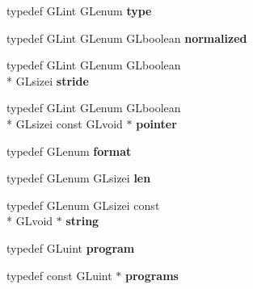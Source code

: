 \begin{DoxyCompactItemize}
\item 
\hypertarget{class_c_p_v_r_tgles_ext_a5308e926ccad106956900ab5d4c05d42}{typedef G\+Lint G\+Lenum {\bfseries type}}\label{class_c_p_v_r_tgles_ext_a5308e926ccad106956900ab5d4c05d42}

\item 
\hypertarget{class_c_p_v_r_tgles_ext_aed0f3a271ef843d49740bcd8c2b6e8bb}{typedef G\+Lint G\+Lenum G\+Lboolean {\bfseries normalized}}\label{class_c_p_v_r_tgles_ext_aed0f3a271ef843d49740bcd8c2b6e8bb}

\item 
\hypertarget{class_c_p_v_r_tgles_ext_af1d0894683af5fa10e460a1ba28d6939}{typedef G\+Lint G\+Lenum G\+Lboolean \\*
G\+Lsizei {\bfseries stride}}\label{class_c_p_v_r_tgles_ext_af1d0894683af5fa10e460a1ba28d6939}

\item 
\hypertarget{class_c_p_v_r_tgles_ext_ae19fe1cea28a7fb2874dda0bd8499c51}{typedef G\+Lint G\+Lenum G\+Lboolean \\*
G\+Lsizei const G\+Lvoid $\ast$ {\bfseries pointer}}\label{class_c_p_v_r_tgles_ext_ae19fe1cea28a7fb2874dda0bd8499c51}

\item 
\hypertarget{class_c_p_v_r_tgles_ext_a91c81435759c3d9e39ad635fb45f32f0}{typedef G\+Lenum {\bfseries format}}\label{class_c_p_v_r_tgles_ext_a91c81435759c3d9e39ad635fb45f32f0}

\item 
\hypertarget{class_c_p_v_r_tgles_ext_a5270e4af3284ff77df101d862974bdb9}{typedef G\+Lenum G\+Lsizei {\bfseries len}}\label{class_c_p_v_r_tgles_ext_a5270e4af3284ff77df101d862974bdb9}

\item 
\hypertarget{class_c_p_v_r_tgles_ext_ab3e1ee5831f5e8bdc658635adb1872b1}{typedef G\+Lenum G\+Lsizei const \\*
G\+Lvoid $\ast$ {\bfseries string}}\label{class_c_p_v_r_tgles_ext_ab3e1ee5831f5e8bdc658635adb1872b1}

\item 
\hypertarget{class_c_p_v_r_tgles_ext_aaa955396ce1535b0bad8e864cb6f70a0}{typedef G\+Luint {\bfseries program}}\label{class_c_p_v_r_tgles_ext_aaa955396ce1535b0bad8e864cb6f70a0}

\item 
\hypertarget{class_c_p_v_r_tgles_ext_a0424201e2433098d279605a476247291}{typedef const G\+Luint $\ast$ {\bfseries programs}}\label{class_c_p_v_r_tgles_ext_a0424201e2433098d279605a476247291}


\end{DoxyCompactItemize}
